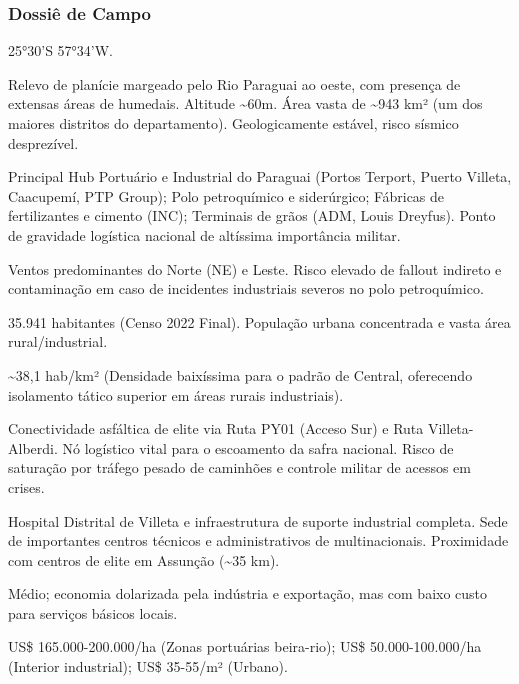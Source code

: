 \subsubsection{Dossiê de Campo}
\begin{description}[style=nextline,leftmargin=0.5cm,font=\bfseries]
\item[Coordenadas]  25°30'S 57°34'W.
\item[Topografia]  Relevo de planície margeado pelo Rio Paraguai ao oeste, com presença de extensas áreas de humedais. Altitude \textasciitilde 60m. Área vasta de \textasciitilde 943 km² (um dos maiores distritos do departamento). Geologicamente estável, risco sísmico desprezível.
\item[Alvos Estratégicos]  Principal Hub Portuário e Industrial do Paraguai (Portos Terport, Puerto Villeta, Caacupemí, PTP Group); Polo petroquímico e siderúrgico; Fábricas de fertilizantes e cimento (INC); Terminais de grãos (ADM, Louis Dreyfus). Ponto de gravidade logística nacional de altíssima importância militar.
\item[Fallout]  Ventos predominantes do Norte (NE) e Leste. Risco elevado de fallout indireto e contaminação em caso de incidentes industriais severos no polo petroquímico.
\item[População]  35.941 habitantes (Censo 2022 Final). População urbana concentrada e vasta área rural/\allowbreak industrial.
\item[Densidade]  \textasciitilde 38,1 hab/\allowbreak km² (Densidade baixíssima para o padrão de Central, oferecendo isolamento tático superior em áreas rurais industriais).
\item[Vias de Acesso]  Conectividade asfáltica de elite via Ruta PY01 (Acceso Sur) e Ruta Villeta-Alberdi. Nó logístico vital para o escoamento da safra nacional. Risco de saturação por tráfego pesado de caminhões e controle militar de acessos em crises.
\item[Serviços]  Hospital Distrital de Villeta e infraestrutura de suporte industrial completa. Sede de importantes centros técnicos e administrativos de multinacionais. Proximidade com centros de elite em Assunção (\textasciitilde 35 km).
\item[Custo de Vida]  Médio; economia dolarizada pela indústria e exportação, mas com baixo custo para serviços básicos locais.
\item[Preço da Terra]  US\$ 165.000-200.000/\allowbreak ha (Zonas portuárias beira-rio); US\$ 50.000-100.000/\allowbreak ha (Interior industrial); US\$ 35-55/\allowbreak m² (Urbano).

\end{description}
